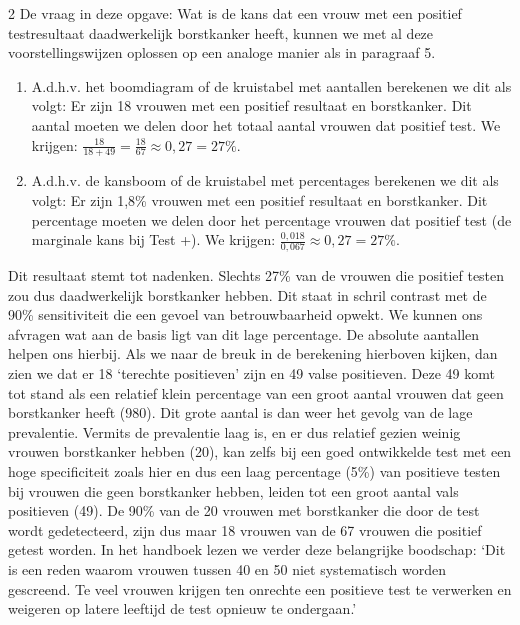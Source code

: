 \begin{multicols}{2}
De vraag in deze opgave: Wat is de kans dat een vrouw met een positief testresultaat daadwerkelijk borstkanker heeft, kunnen we met al deze voorstellingswijzen oplossen op een analoge manier als in paragraaf 5.
\begin{enumerate}
    \item 	A.d.h.v. het boomdiagram of de kruistabel met aantallen berekenen we dit als volgt: Er zijn 18 vrouwen met een positief resultaat en borstkanker. Dit aantal moeten we delen door het totaal aantal vrouwen dat positief test. We krijgen:  $\frac{18}{18+49}=\frac{18}{67} \approx 0,27=27\%$.
    \item 	A.d.h.v. de kansboom of de kruistabel met percentages berekenen we dit als volgt: Er zijn 1,8\% vrouwen met een positief resultaat en borstkanker. Dit percentage moeten we delen door het percentage vrouwen dat positief test (de marginale kans bij Test +). We krijgen:  $\frac{0,018}{0,067} \approx 0,27=27\%$.
\end{enumerate}
Dit resultaat stemt tot nadenken. Slechts 27\% van de vrouwen die positief testen zou dus daadwerkelijk borstkanker hebben. Dit staat in schril contrast met de 90\% sensitiviteit die een gevoel van betrouwbaarheid opwekt. We kunnen ons afvragen wat aan de basis ligt van dit lage percentage. De absolute aantallen helpen ons hierbij. Als we naar de breuk in de berekening hierboven kijken, dan zien we dat er 18 ‘terechte positieven’ zijn en 49 valse positieven. Deze 49 komt tot stand als een relatief klein percentage van een groot aantal vrouwen dat geen borstkanker heeft (980). Dit grote aantal is dan weer het gevolg van de lage prevalentie. Vermits de prevalentie laag is, en er dus relatief gezien weinig vrouwen borstkanker hebben (20), kan zelfs bij een goed ontwikkelde test met een hoge specificiteit zoals hier en dus een laag percentage (5\%) van positieve testen bij vrouwen die geen borstkanker hebben, leiden tot een groot aantal vals positieven (49). De 90\% van de 20 vrouwen met borstkanker die door de test wordt gedetecteerd, zijn dus maar 18 vrouwen van de 67 vrouwen die positief getest worden. In het handboek lezen we verder deze belangrijke boodschap: ‘Dit is een reden waarom vrouwen tussen 40 en 50 niet systematisch worden gescreend. Te veel vrouwen krijgen ten onrechte een positieve test te verwerken en weigeren op latere leeftijd de test opnieuw te ondergaan.’  
    

\end{multicols}
